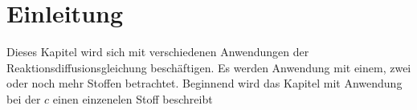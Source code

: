 %
%
%
%
\section{Einleitung\label{reaktdiff:section:teil0}}

Dieses Kapitel wird sich mit verschiedenen Anwendungen der Reaktionsdiffusionsgleichung beschäftigen.
Es werden Anwendung mit einem, zwei oder noch mehr Stoffen betrachtet.
Beginnend wird das Kapitel mit Anwendung bei der \(c\) einen einzenelen Stoff beschreibt




